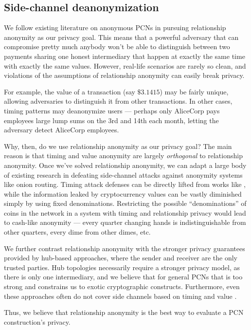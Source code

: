 \documentclass[USenglish,oneside,twocolumn]{article}
\begin{document}
\subsection{Side-channel deanonymization}

We follow existing literature on anonymous PCNs \cite{malavolta2017concurrency} \cite{malavolta2019anonymous} in pursuing relationship anonymity as our privacy goal. This means that a powerful adversary that can compromise pretty much anybody won't be able to distinguish between two payments sharing one honest intermediary that happen at exactly the same time with exactly the same values. However, real-life scenarios are rarely so clean, and violations of the assumptions of relationship anonymity can easily break privacy.

For example, the value of a transaction (say $\$3.1415$) may be fairly unique, allowing adversaries to distinguish it from other transactions. In other cases, timing patterns may deanonymize users --- perhaps only AliceCorp pays employees large lump sums on the 3rd and 14th each month, letting the adversary detect AliceCorp employees.

Why, then, do we use relationship anonymity as our privacy goal? The main reason is that timing and value anonymity are largely \emph{orthogonal} to relationship anonymity. Once we've solved relationship anonymity, we can adapt a large body of existing research in defeating side-channel attacks against anonymity systems like onion routing. Timing attack defenses can be directly lifted from works like \cite{feigenbaum2010preventing}, while the information leaked by cryptocurrency values can be vastly diminished simply by using fixed denominations. Restricting the possible ``denominations'' of coins in the network in a system with timing and relationship privacy would lead to cash-like anonymity --- every quarter changing hands is indistinguishable from other quarters, every dime from other dimes, etc.

We further contrast relationship anonymity with the stronger privacy guarantees provided by hub-based approaches, where the sender and receiver are the only trusted parties. Hub topologies necessarily require a stronger privacy model, as there is only one intermediary, and we believe that for general PCNs that is too strong and constrains us to exotic cryptographic constructs. Furthermore, even these approaches often do not cover side channels based on timing and value \cite{green2017bolt}.

Thus, we believe that relationship anonymity is the best way to evaluate a PCN construction's privacy.
\end{document}

